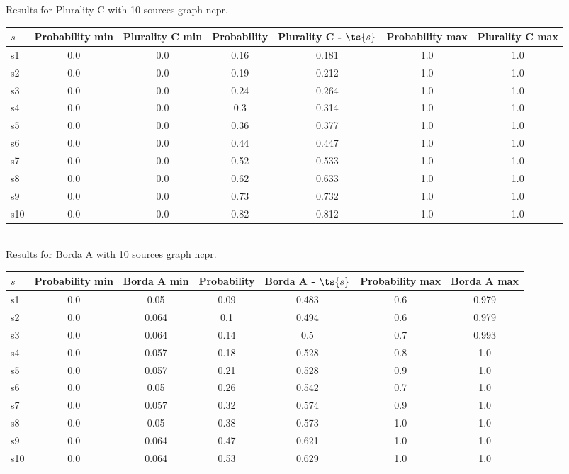 \documentclass{article}
\begin{document}
\noindent Results for Plurality C with 10 sources graph ncpr.

\noindent\begin{tabular}{|l|c|c|c|c|c|c|}
\hline
$s$& Probability min & Plurality C min & Probability & Plurality C - $\ts{s}$ & Probability max & Plurality C max\\
\hline
s1 &0.0 & 0.0 & 0.16 & 0.181 & 1.0 & 1.0\\
\hline
s2 &0.0 & 0.0 & 0.19 & 0.212 & 1.0 & 1.0\\
\hline
s3 &0.0 & 0.0 & 0.24 & 0.264 & 1.0 & 1.0\\
\hline
s4 &0.0 & 0.0 & 0.3 & 0.314 & 1.0 & 1.0\\
\hline
s5 &0.0 & 0.0 & 0.36 & 0.377 & 1.0 & 1.0\\
\hline
s6 &0.0 & 0.0 & 0.44 & 0.447 & 1.0 & 1.0\\
\hline
s7 &0.0 & 0.0 & 0.52 & 0.533 & 1.0 & 1.0\\
\hline
s8 &0.0 & 0.0 & 0.62 & 0.633 & 1.0 & 1.0\\
\hline
s9 &0.0 & 0.0 & 0.73 & 0.732 & 1.0 & 1.0\\
\hline
s10 &0.0 & 0.0 & 0.82 & 0.812 & 1.0 & 1.0\\
\hline
\end{tabular}\\

\noindent Results for Borda A with 10 sources graph ncpr.

\noindent\begin{tabular}{|l|c|c|c|c|c|c|}
\hline
$s$& Probability min & Borda A min & Probability & Borda A - $\ts{s}$ & Probability max & Borda A max\\
\hline
s1 &0.0 & 0.05 & 0.09 & 0.483 & 0.6 & 0.979\\
\hline
s2 &0.0 & 0.064 & 0.1 & 0.494 & 0.6 & 0.979\\
\hline
s3 &0.0 & 0.064 & 0.14 & 0.5 & 0.7 & 0.993\\
\hline
s4 &0.0 & 0.057 & 0.18 & 0.528 & 0.8 & 1.0\\
\hline
s5 &0.0 & 0.057 & 0.21 & 0.528 & 0.9 & 1.0\\
\hline
s6 &0.0 & 0.05 & 0.26 & 0.542 & 0.7 & 1.0\\
\hline
s7 &0.0 & 0.057 & 0.32 & 0.574 & 0.9 & 1.0\\
\hline
s8 &0.0 & 0.05 & 0.38 & 0.573 & 1.0 & 1.0\\
\hline
s9 &0.0 & 0.064 & 0.47 & 0.621 & 1.0 & 1.0\\
\hline
s10 &0.0 & 0.064 & 0.53 & 0.629 & 1.0 & 1.0\\
\hline
\end{tabular}\\
\end{document}
